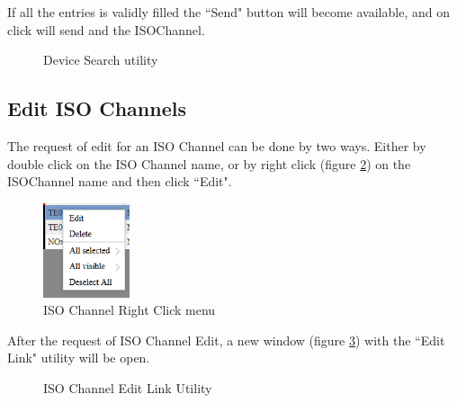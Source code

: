 If all the entries is validly filled the ``Send" button will become available, and on click will send and the ISOChannel.

\begin{figure}[h]
\centering
	\caption{Device Search utility}
	\label{fig:Device_Search}
\end{figure}

\newpage
\subsection{Edit ISO Channels}
The request of edit for an ISO Channel can be done by two ways.
Either by double click on the ISO Channel name,
or by right click (figure \ref{fig:right_click}) on the ISOChannel name and then click ``Edit".

\begin{figure}[h]
\centering
	\includegraphics[width=1in,angle=0]{../art/Morfeas_web_if/right_click.png}
	\caption{ISO Channel Right Click menu}
	\label{fig:right_click}
\end{figure}

After the request of ISO Channel Edit, a new window (figure \ref{fig:edit_link}) with the ``Edit Link" utility will be open.

\begin{figure}[h]
\centering
	\caption{ISO Channel Edit Link Utility}
	\label{fig:edit_link}
\end{figure}